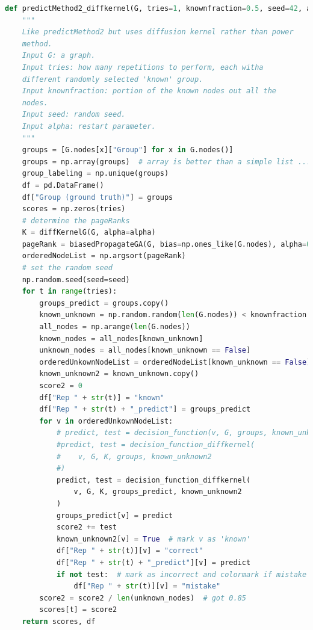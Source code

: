 \documentclass[a4paper,10pt]{article}
\theoremstyle{definition}
\theoremstyle{remark}
\theoremstyle{plain}
\begin{document}
\begin{lstlisting}[language=python]
def predictMethod2_diffkernel(G, tries=1, knownfraction=0.5, seed=42, alpha=0.2):
    """
    Like predictMethod2 but uses diffusion kernel rather than power
    method.
    Input G: a graph.
    Input tries: how many repetitions to perform, each witha
    different randomly selected 'known' group.
    Input knownfraction: portion of the known nodes out all the
    nodes.
    Input seed: random seed.
    Input alpha: restart parameter.
    """
    groups = [G.nodes[x]["Group"] for x in G.nodes()]
    groups = np.array(groups)  # array is better than a simple list ...
    group_labeling = np.unique(groups)
    df = pd.DataFrame()
    df["Group (ground truth)"] = groups
    scores = np.zeros(tries)
    # determine the pageRanks
    K = diffKernelG(G, alpha=alpha)
    pageRank = biasedPropagateGA(G, bias=np.ones_like(G.nodes), alpha=0.2)
    orderedNodeList = np.argsort(pageRank)
    # set the random seed
    np.random.seed(seed=seed)
    for t in range(tries):
        groups_predict = groups.copy()
        known_unknown = np.random.random(len(G.nodes)) < knownfraction  # known=1
        all_nodes = np.arange(len(G.nodes))
        known_nodes = all_nodes[known_unknown]
        unknown_nodes = all_nodes[known_unknown == False]
        orderedUnkownNodeList = orderedNodeList[known_unknown == False]
        known_unknown2 = known_unknown.copy()
        score2 = 0
        df["Rep " + str(t)] = "known"
        df["Rep " + str(t) + "_predict"] = groups_predict
        for v in orderedUnkownNodeList:
            # predict, test = decision_function(v, G, groups, known_unknown2, alpha=alpha)
            #predict, test = decision_function_diffkernel(
            #    v, G, K, groups, known_unknown2
            #)
            predict, test = decision_function_diffkernel(
                v, G, K, groups_predict, known_unknown2
            )
            groups_predict[v] = predict
            score2 += test
            known_unknown2[v] = True  # mark v as 'known'
            df["Rep " + str(t)][v] = "correct"
            df["Rep " + str(t) + "_predict"][v] = predict
            if not test:  # mark as incorrect and colormark if mistake
                df["Rep " + str(t)][v] = "mistake"
        score2 = score2 / len(unknown_nodes)  # got 0.85
        scores[t] = score2
    return scores, df
\end{lstlisting}

\end{document}
